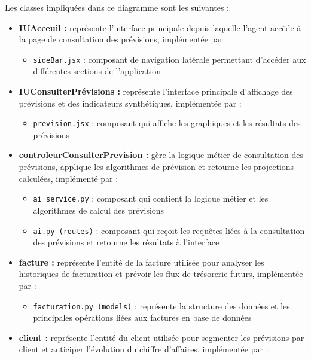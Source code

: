Les classes impliquées dans ce diagramme sont les suivantes :
\begin{itemize}[leftmargin=2em, topsep=4pt, itemsep=4pt]
  \item \textbf{IUAcceuil :} représente l'interface principale depuis laquelle l'agent accède à la page de consultation des prévisions, implémentée par :
  \begin{itemize}[leftmargin=2em, topsep=2pt, itemsep=2pt]
    \item \texttt{sideBar.jsx} : composant de navigation latérale permettant d'accéder aux différentes sections de l'application
  \end{itemize}
  \item \textbf{IUConsulterPrévisions :} représente l'interface principale d'affichage des prévisions et des indicateurs synthétiques, implémentée par :
  \begin{itemize}[leftmargin=2em, topsep=2pt, itemsep=2pt]
    \item \texttt{prevision.jsx} : composant qui affiche les graphiques et les résultats des prévisions
  \end{itemize}
  \item \textbf{controleurConsulterPrevision :} gère la logique métier de consultation des prévisions, applique les algorithmes de prévision et retourne les projections calculées, implémenté par :
  \begin{itemize}[leftmargin=2em, topsep=2pt, itemsep=2pt]
    \item \texttt{ai\_service.py} : composant qui contient la logique métier et les algorithmes de calcul des prévisions
    \item \texttt{ai.py (routes)} : composant qui reçoit les requêtes liées à la consultation des prévisions et retourne les résultats à l'interface
  \end{itemize}
  \item \textbf{facture :} représente l'entité de la facture utilisée pour analyser les historiques de facturation et prévoir les flux de trésorerie futurs, implémentée par :
  \begin{itemize}[leftmargin=2em, topsep=2pt, itemsep=2pt]
    \item \texttt{facturation.py (models)} : représente la structure des données et les principales opérations liées aux factures en base de données
  \end{itemize}
  \item \textbf{client :} représente l'entité du client utilisée pour segmenter les prévisions par client et anticiper l'évolution du chiffre d'affaires, implémentée par :

\end{itemize}
